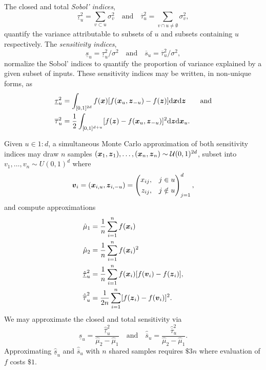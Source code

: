 \documentclass{article}
\begin{document}
The closed and total \emph{Sobol' indices},
\begin{equation}
    \underline{\tau}_u^2 = \sum_{v \subset u} \sigma^2_v \quad \text{and} \quad 
    \overline{\tau}_u^2 = \sum_{v \cap u \neq \emptyset} \sigma^2_v,
\end{equation}
quantify the variance attributable to subsets of $u$ and subsets containing $u$ respectively. The \emph{sensitivity indices},
\begin{equation}
    \underline{s}_u = \underline{\tau}_u^2/\sigma^2 \quad \text{and} \quad 
    \overline{s}_u = \overline{\tau}_u^2/\sigma^2,
\end{equation}
normalize the Sobol' indices to quantify the proportion of variance explained by a given subset of inputs. These sensitivity indices may be written, in non-unique forms, as
\begin{align}
    \underline{\tau}_u^2 &= \int_{[0,1]^{2d}} f(\boldsymbol{x})[f(\boldsymbol{x}_u,\boldsymbol{z}_{-u})-f(\boldsymbol{z})]\mathrm{d}\boldsymbol{x}\mathrm{d}\boldsymbol{z} \qquad \text{and} \\
    \overline{\tau}_u^2 &= \frac{1}{2}\int_{[0,1]^{d+u}} [f(\boldsymbol{z})-f(\boldsymbol{x}_u,\boldsymbol{z}_{-u})]^2\mathrm{d}\boldsymbol{z}\mathrm{d}\boldsymbol{x}_u.
\end{align}

Given $u \in 1:d$, a simultaneous Monte Carlo approximation of both sensitivity indices may draw $n$ samples $(\boldsymbol{x}_1,\boldsymbol{z}_1), \dots, (\boldsymbol{x}_n,\boldsymbol{z}_n) \sim \mathcal{U}(0,1)^{2d}$, subset into $v_1,\dots,v_n \sim U(0,1)^d$ where
\begin{equation}
    \boldsymbol{v}_i = (\boldsymbol{x}_{i,u},\boldsymbol{z}_{i,-u}) = \left(\begin{aligned}x_{ij}, \quad & j \in u \\ z_{ij}, \quad & j \notin u \end{aligned}\right)_{j=1}^d,
\end{equation}
and compute approximations
\begin{align}
    \hat{\mu}_1 &= \frac{1}{n} \sum_{i=1}^n f(\bx_i) \\ %
    \hat{\mu}_2 &= \frac{1}{n} \sum_{i=1}^n f(\bx_i)^2 \\ %
    \hat{\underline{\tau}}_u^2 &= \frac{1}{n} \sum_{i=1}^n f(\bx_i)[f(\bv_i) - f(\bz_i)], \\ %
    \hat{\overline{\tau}}_u^2 &= \frac{1}{2n} \sum_{i=1}^n [f(\bz_i)-f(\bv_i)]^2. %
\end{align}
We may approximate the closed and total sensitivity via
\begin{equation}
    \hat{\underline{s}}_u = \frac{\hat{\underline{\tau}}_u^2}{\hat{\mu}_2-\hat{\mu}_1} \quad \text{and} \quad 
    \hat{\overline{s}}_u = \frac{\hat{\overline{\tau}}_u^2}{\hat{\mu}_2-\hat{\mu}_1}.
\end{equation}
Approximating $\hat{\underline{s}}_u$ and $\hat{\overline{s}}_u$ with $n$ shared samples requires $\$3n$ where evaluation of $f$ costs $\$1$. 
\end{document}
